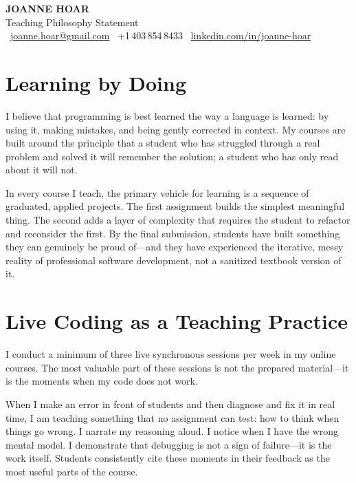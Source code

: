 \documentclass[11pt]{article}
\begin{document}
\pagestyle{empty}

\begin{center}
{\Large \textbf{\textcolor{accent}{JOANNE HOAR}}} \\[4pt]
{\large Teaching Philosophy Statement} \\[4pt]
~\href{mailto:joanne.hoar@gmail.com}{joanne.hoar@gmail.com} \quad
{}~+1\,403\,854\,8433 \quad
{}~\href{https://linkedin.com/in/joanne-hoar/}{linkedin.com/in/joanne-hoar}
\end{center}

\vspace{12pt}

\section*{Learning by Doing}

I believe that programming is best learned the way a language is learned: by using it, making mistakes, and being gently corrected in context. My courses are built around the principle that a student who has struggled through a real problem and solved it will remember the solution; a student who has only read about it will not.

In every course I teach, the primary vehicle for learning is a sequence of graduated, applied projects. The first assignment builds the simplest meaningful thing. The second adds a layer of complexity that requires the student to refactor and reconsider the first. By the final submission, students have built something they can genuinely be proud of---and they have experienced the iterative, messy reality of professional software development, not a sanitized textbook version of it.

\section*{Live Coding as a Teaching Practice}

I conduct a minimum of three live synchronous sessions per week in my online courses. The most valuable part of these sessions is not the prepared material---it is the moments when my code does not work.

When I make an error in front of students and then diagnose and fix it in real time, I am teaching something that no assignment can test: how to think when things go wrong. I narrate my reasoning aloud. I notice when I have the wrong mental model. I demonstrate that debugging is not a sign of failure---it is the work itself. Students consistently cite these moments in their feedback as the most useful parts of the course.
\end{document}
